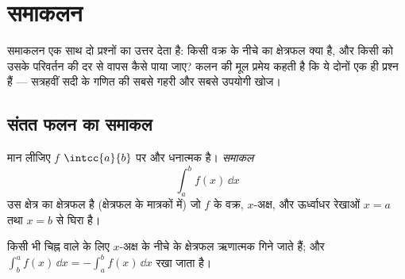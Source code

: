 \chapter{समाकलन}\label{ch:g12:integ}

समाकलन एक साथ दो प्रश्नों का उत्तर देता है: किसी वक्र के नीचे का क्षेत्रफल
क्या है, और किसी  को उसके परिवर्तन की दर से वापस कैसे पाया जाए? कलन की मूल
प्रमेय कहती है कि ये दोनों एक ही प्रश्न हैं --- सत्रहवीं सदी के गणित की सबसे
गहरी और सबसे उपयोगी खोज।

\section{संतत फलन का समाकल}

\begin{definition}[धनात्मक फलन का समाकल]\label{def:g12:integ:area}
मान लीजिए $f$ $\intcc{a}{b}$ पर  और धनात्मक है। \emph{समाकल}
\[
\int_a^b f(x)\,\dd x
\]
उस क्षेत्र का क्षेत्रफल है (क्षेत्रफल के मात्रकों में) जो $f$ के वक्र,
$x$-अक्ष, और ऊर्ध्वाधर रेखाओं $x = a$ तथा $x = b$ से घिरा है।
\end{definition}

\begin{omfigure}
\end{omfigure}

किसी भी चिह्न वाले  के लिए $x$-अक्ष के नीचे के क्षेत्रफल ऋणात्मक गिने
जाते हैं; और $\int_b^a f(x)\,\dd x = -\int_a^b f(x)\,\dd x$ रखा जाता है।

